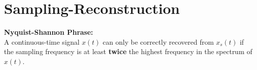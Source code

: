 \section{Sampling-Reconstruction}
\textbf{Nyquist-Shannon Phrase:}\\
A continuous-time signal $x(t)$ can only be correctly recovered from $x_{s}(t)$ if the sampling frequency is at least \textbf{twice} the highest frequency in the spectrum of $x(t)$.
